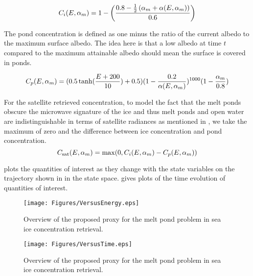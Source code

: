 \begin{equation}\label{eq:iceconcentration}
C_i(E,\alpha_m)=1-\left(\frac{0.8-\frac{1}{2}\left( \alpha_m+\alpha(E,\alpha_m)\right)}{0.6}\right)
\end{equation}

\par The pond concentration is defined as one minus the ratio of the current albedo to the maximum surface albedo. The idea here is that a low albedo at time $t$ compared to the maximum attainable albedo should mean the surface is covered in ponds. 

\begin{equation}\label{eq:pondconcentration}
C_p(E,\alpha_m)=(0.5\tanh(\frac{E+200}{10})+0.5)(1-\frac{0.2}{\alpha(E,\alpha_m)})^{1000}(1-\frac{\alpha_m}{0.8})
\end{equation}

\par For the satellite retrieved concentration, to model the fact that the melt ponds obscure the microwave signature of the ice and thus melt ponds and open water are indistinguishable in terms of satellite radiances as mentioned in , we take the maximum of zero and the difference between ice concentration and pond concentration.
\begin{equation}\label{eq:satelliteretrieval}
C_{\text{sat}}(E,\alpha_m)=\max(0,C_i(E,\alpha_m)-C_p(E,\alpha_m))
\end{equation}

 plots the quantities of interest as they change with the state variables on the trajectory shown in  in the state space.  gives plots of the time evolution of quantities of interest.

\begin{figure}\label{fig:modelreview}
\begin{center}
\texttt{[image: Figures/VersusEnergy.eps]} 
\end{center}
\caption{Overview of the proposed proxy for the melt pond problem in sea ice concentration retrieval.}
\end{figure}

\begin{figure}\label{fig:modelreview2}
\begin{center}
\texttt{[image: Figures/VersusTime.eps]} 
\end{center}
\caption{Overview of the proposed proxy for the melt pond problem in sea ice concentration retrieval.}
\end{figure}

